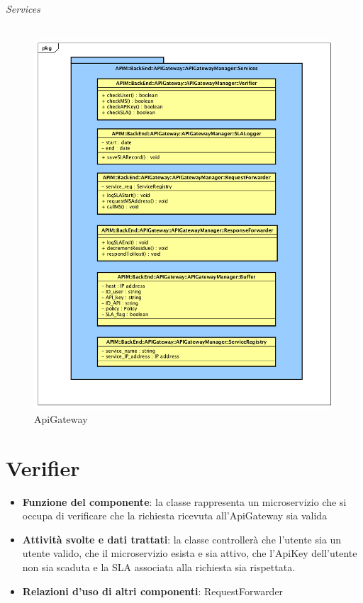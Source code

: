 \subparagraph{Services}
\begin{figure}[!htbp]
	\centering
	\includegraphics[scale=0.45]{UML/DiagrammiPackage/ApiGatewayManagerServices.png}
	\caption{ApiGateway}
\end{figure}
\FloatBarrier

\chapter{Verifier}
\begin{itemize}
	\item \textbf{Funzione del componente}: la classe rappresenta un microservizio che si occupa di verificare che la richiesta ricevuta all'ApiGateway sia valida
	\item \textbf{Attivit\`{a} svolte e dati trattati}: la classe controller\`{a} che l'utente sia un utente valido, che il microservizio esista e sia attivo, che l'ApiKey dell'utente non sia scaduta e la SLA associata alla richiesta sia rispettata.
	\item \textbf{Relazioni d'uso di altri componenti}: RequestForwarder

\end{itemize}

